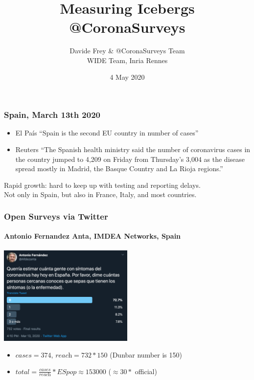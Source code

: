 \documentclass{beamer}
\title{Measuring Icebergs @CoronaSurveys}
\author{Davide Frey \& @CoronaSurveys Team\\
\vspace{8pt}WIDE Team, Inria Rennes}
\date{4 May 2020}
\begin{document}
\frame[plain]{
\titlepage
\begin{center}
\end{center}
}

\begin{frame}
  \frametitle{Spain, March 13th 2020}

  \begin{itemize}
    \item El País ``Spain is the second EU country in number of cases''

    \item Reuters ``The Spanish health ministry said the number of coronavirus cases in the country jumped to 4,209 on Friday from Thursday's 3,004 as the disease spread mostly in Madrid, the Basque Country and La Rioja regions.''
  \end{itemize}
\vspace{1ex}
  Rapid growth: hard to keep up with testing and reporting delays. \\
  \vspace{3ex}
  Not only in Spain, but also in France, Italy, and most countries.

\end{frame}

\begin{frame}
  \frametitle{Open Surveys via Twitter}
  \framesubtitle{Antonio Fernandez Anta, IMDEA Networks, Spain}
  \begin{center}
  \includegraphics[width=0.5\textwidth]{Twitter.png}
  \end{center}
  \begin{itemize}
    \item $\textit{cases}=374$, $\textit{reach}=732*150$ \hfill (Dunbar number is 150)
    \item $\textit{total}=\frac{\textit{cases}}{\textit{reach}}*\textit{ESpop} \approx 153000 $ \hfill ($\approx 30*$ official)
  \end{itemize}
\end{frame}
\end{document}
